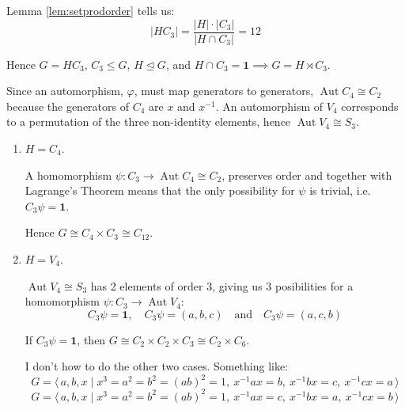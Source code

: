 \documentclass[a4paper, oneside, 12pt, final]{article}
\theoremstyle{definition}
\DeclareMathOperator{\Aut}{Aut}
\begin{document}
Lemma \ref{lem:setprodorder} tells us:
\[|H C_3| = \frac{|H| \cdot |C_3|}{|H \cap C_3|} = 12\]

Hence \(G = H C_3\), \(C_3 \leqslant G\), \(H \unlhd G\), and \(H \cap C_3 =
\bm{1} \implies G = H \rtimes C_3\).

Since an automorphism, \(\varphi\), must map generators to generators,
\(\Aut{C_4} \cong C_2\) because the generators of \(C_4\) are \(x\) and
\(x^{-1}\).
An automorphism of \(V_4\) corresponds to a permutation of the three
non-identity elements, hence \(\Aut{V_4} \cong S_3\).

\begin{enumerate}
    \item \(H = C_4\).

        A homomorphism \(\psi:C_3 \to \Aut{C_4} \cong C_2\), preserves order
        and together with Lagrange's Theorem means that the only possibility
        for \(\psi\) is trivial, i.e. \(C_3\psi = \bm{1}\).

        Hence \(G \cong C_4 \times C_3 \cong C_{12}\).

    \item \(H = V_4\).

        \(\Aut{V_4} \cong S_3\) has 2 elements of order 3, giving us 3
        posibilities for a homomorphism \(\psi:C_3 \to \Aut{V_4}\):
        \[C_3\psi = \bm{1}, \quad C_3\psi = (a, b, c) \quad \text{and} \quad
        C_3\psi = (a, c, b)\]

        If \(C_3\psi = \bm{1}\), then \(G \cong C_2 \times C_2 \times C_3 \cong
        C_2 \times C_6\).

        I don't how to do the other two cases. Something like:
        \[G = \langle\, a, b, x \mid x^3 = a^2 = b^2 = (ab)^2 = 1,\ x^{-1}ax =
        b,\ x^{-1}bx = c,\ x^{-1}cx = a\, \rangle\]
        \[G = \langle\, a, b, x \mid x^3 = a^2 = b^2 = (ab)^2 = 1,\ x^{-1}ax =
        c,\ x^{-1}bx = a,\ x^{-1}cx = b\, \rangle\]
\end{enumerate}
\end{document}
